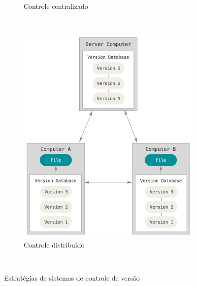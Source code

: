 \begin{figure}[h]
\begin{subfigure}[b]{0.3\textwidth}
      \caption{Controle centralizado}
      \label{fig:version-control-centralized}
    \end{subfigure}
    ~
	\begin{subfigure}[b]{0.3\textwidth}
       \includegraphics[width=\textwidth]{pfc/figuras/control-version-distributed.png}
       \caption{Controle distribuído}
       \label{fig:version-control-distributed}
    \end{subfigure}
    ~
    \caption{Estratégias de sistemas de controle de versão}
    \label{fig:version-control}
\end{figure}
